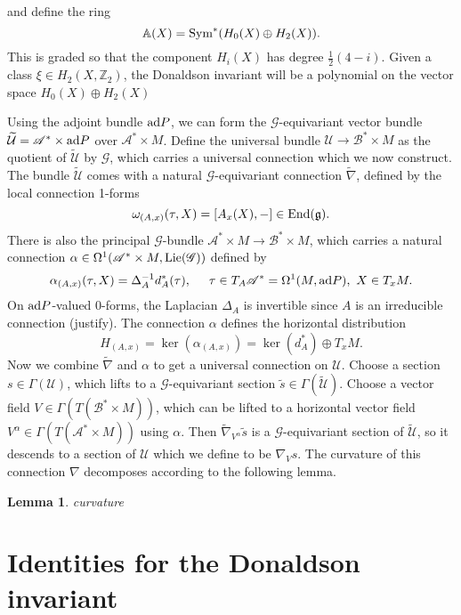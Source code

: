 \documentclass[a4paper]{article}
\newcommand{\Z}{\mathbb{Z}}
\newcommand{\A}{\mathscr{A}}
\newcommand{\B}{\mathscr{B}}
\newcommand{\U}{\mathcal{U}}
\newcommand{\GG}{\mathscr{G}}
\newcommand{\ra}{\rightarrow}
\newcommand{\Lie}{\textnormal{Lie}}
\newcommand{\Sym}{\textnormal{Sym}}
\newcommand{\End}{\textnormal{End}}
\newcommand{\ad}{\textnormal{ad}}
\newtheorem{lemma}[theorem]{Lemma}
\theoremstyle{definition}
\numberwithin{theorem}{subsection}
\begin{document}
and define the ring
$$\mathbb{A}(X) = \Sym^*(H_0(X)\oplus H_2(X)).$$
This is graded so that the component $H_i(X)$ has degree $\frac{1}{2}(4-i)$. Given a class $\xi\in H_2(X,\Z_2)$, the Donaldson invariant will be a 
polynomial on the vector space $H_0(X)\oplus H_2(X)$


Using the adjoint bundle $\ad P$, we can form the $\GG$-equivariant vector bundle $\widetilde{\U}=\A^*\times\ad P$ over $\A^*\times M$. Define the universal bundle $\U\ra \B^*\times M$ as the quotient of $\widetilde{\U}$ by $\GG$, which carries a universal connection which we now construct. The bundle $\widetilde{\U}$ comes with a natural $\GG$-equivariant connection $\widetilde{\nabla}$, defined by the local connection 1-forms
$$\omega_{(A,x)}(\tau,X)=[A_x(X),-]\in\End(\mathfrak{g}).$$
There is also the principal $\GG$-bundle $\A^*\times M\ra \B^*\times M$, which carries a natural connection $\alpha\in\Omega^1(\A^*\times M,\Lie(\GG))$ defined by
$$\alpha_{(A,x)}(\tau,X)=\Delta_A^{-1}d_A^*(\tau),\hspace{5mm}\tau\in T_A\A^*=\Omega^1(M,\ad P),\ X\in T_xM.$$
On $\ad P$-valued $0$-forms, the Laplacian $\Delta_A$ is invertible since $A$ is an irreducible connection (justify). The connection $\alpha$ defines the horizontal distribution $$H_{(A,x)}=\ker(\alpha_{(A,x)})=\ker(d_A^*)\oplus T_xM.$$
Now we combine $\widetilde{\nabla}$ and $\alpha$ to get a universal connection on $\U$. Choose a section $s\in\Gamma(\U)$, which lifts to a $\GG$-equivariant section $\widetilde{s}\in\Gamma(\widetilde{\U})$. Choose a vector field $V\in \Gamma(T(\B^*\times M))$, which can be lifted to a horizontal vector field $V^\alpha\in\Gamma(T(\A^*\times M))$ using $\alpha$. Then $\widetilde{\nabla}_{V^\alpha}\widetilde{s}$ is a $\GG$-equivariant section of $\widetilde{\U}$, so it descends to a section of $\U$ which we define to be $\nabla_V s$. The curvature of this connection $\nabla$ decomposes according to the following lemma.

\begin{lemma}
    curvature
\end{lemma}

\section{Identities for the Donaldson invariant}

\end{document}
